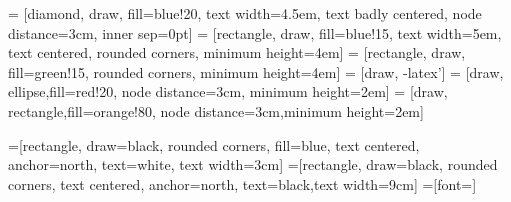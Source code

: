 \documentclass[11pt, a4paper]{article}\usepackage[]{graphicx}\usepackage[]{xcolor}
\begin{document}
\pagestyle{empty}
\footnotesize



\pagebreak

 = [diamond, draw, fill=blue!20, 
    text width=4.5em, text badly centered, node distance=3cm, inner sep=0pt]
 = [rectangle, draw, fill=blue!15, 
    text width=5em, text centered, rounded corners, minimum height=4em]
 = [rectangle, draw, fill=green!15, rounded corners, minimum height=4em]  
 = [draw, -latex']
 = [draw, ellipse,fill=red!20, node distance=3cm,
    minimum height=2em]
 = [draw, rectangle,fill=orange!80, node distance=3cm,minimum height=2em]


=[rectangle, draw=black, rounded corners, fill=blue, text centered, anchor=north, text=white, text width=3cm]
=[rectangle, draw=black, rounded corners, text centered, anchor=north, text=black,text width=9cm]
=[font=\footnotesize]
\end{document}
